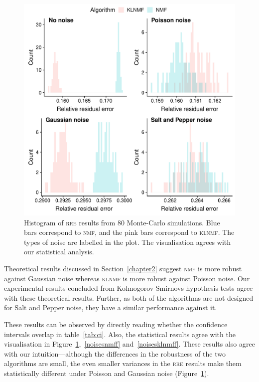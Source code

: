 \begin{figure}
{\centering
\includegraphics[scale=0.8]{histo}
\caption{Histogram of \textsc{rre} results from 80 Monte-Carlo simulations. Blue bars correspond to \textsc{nmf}, and the pink bars correspond to \textsc{klnmf}. The types of noise are labelled in the plot. The visualisation agrees with our statistical analysis.}
\label{histo}}
\end{figure}

Theoretical results discussed in Section~\ref{chapter2} suggest \textsc{nmf} is more robust against Gaussian noise whereas \textsc{klnmf} is more robust against Poisson noise. Our experimental results concluded from Kolmogorov-Smirnovs hypothesis tests agree with these theoretical results. Further, as both of the algorithms are not designed for Salt and Pepper noise, they have a similar performance against it.

These results can be observed by directly reading whether the confidence intervals overlap in table~\ref{tab:ci}. Also, the statistical results agree with the visualisation in Figure~\ref{histo},~\ref{noisesnmff} and~\ref{noisesklnmff}. These results also agree with our intuition---although the differences in the robustness of the two algorithms are small, the even smaller variances in the \textsc{rre} results make them statistically different under Poisson and Gaussian noise (Figure~\ref{histo}).

